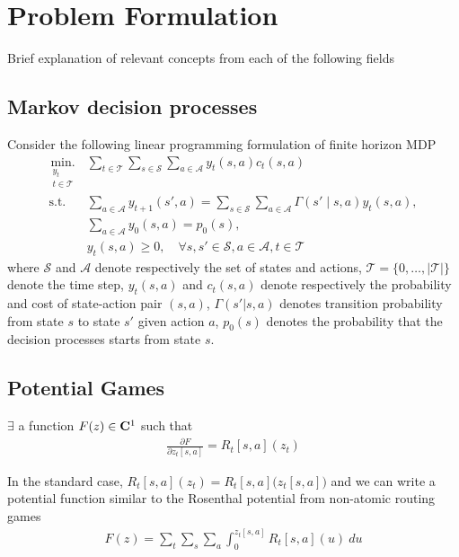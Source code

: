 
\section{Problem Formulation}\label{problemFormulation}
Brief explanation of relevant concepts from each of the following fields
\subsection{Markov decision processes}
Consider the following linear programming formulation of finite horizon MDP \cite{puterman2014markov}
\begin{equation}
\begin{aligned}
\underset{\substack{y_t\\t\in\mathcal{T}}}{\mbox{min.}} & \sum\limits_{t\in\mathcal{T}}\sum\limits_{s\in\mathcal{S}} \sum\limits_{a\in\mathcal{A}} y_t(s, a)c_t(s, a)\\
\mbox{s.t.} &\sum\limits_{a\in\mathcal{A}} y_{t+1}(s', a) = \sum\limits_{s\in\mathcal{S}}\sum\limits_{a\in\mathcal{A}}\Gamma(s'\mid s, a)y_t(s, a),\\
&\sum\limits_{a\in\mathcal{A}}y_0(s, a)=p_0(s),\\
&y_t(s, a)\geq 0,\quad \forall s, s'\in\mathcal{S}, a\in\mathcal{A}, t\in\mathcal{T}
\end{aligned}\label{MDP}
\end{equation}
where \(\mathcal{S}\) and \(\mathcal{A}\) denote respectively the set of states and actions, \(\mathcal{T}=\{0, \ldots, |\mathcal{T}|\}\) denote the time step, \(y_t(s, a)\) and \(c_t(s, a)\) denote respectively the probability and cost of state-action pair \((s, a)\), \(\Gamma(s'|s, a)\) denotes transition probability from state \(s\) to state \(s'\) given action \(a\), \(p_0(s)\) denotes the probability that the decision processes starts from state \(s\). 

\subsection{Potential Games}
\begin{definition}
$\exists$ a function $F(z) \in \mathbf{C}^1$ such that
\begin{align}
\frac{\partial F}{\partial z_t[s,a]} = R_t[s,a](z_t)
\end{align}
\end{definition}
In the standard case, $R_t[s,a] (z_t) = R_t[s,a]\Big(z_t[s,a]\Big)$ and we can write a potential function similar to the Rosenthal potential from non-atomic routing games
\begin{align}
F(z) = \sum_t \sum_s \sum_a \int_0^{z_t[s,a]} R_t[s,a](u) \ du
\end{align}
